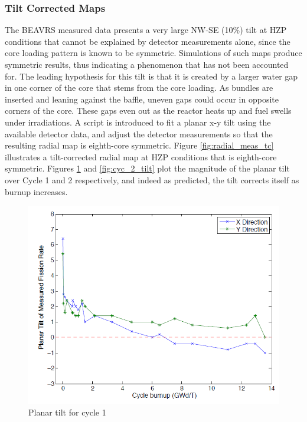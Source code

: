 \subsubsection{Tilt Corrected Maps}
\label{sec:tc_maps}
The BEAVRS measured data presents a very large NW-SE (10\%) tilt at HZP 
conditions that cannot be explained by detector measurements alone, since the 
core loading pattern is known to be symmetric. Simulations of such maps produce 
symmetric results, thus indicating a phenomenon that has not been accounted for. 
The leading hypothesis for this tilt is that it is created by a larger water gap 
in one corner of the core that stems from the core loading. As bundles are inserted 
and leaning against the baffle, uneven gaps could occur in opposite corners of the 
core. These gaps even out as the reactor heats up and fuel swells under irradiations. 
A script is introduced to fit a planar x-y tilt using the available detector data, 
and adjust the detector measurements so that the resulting radial map is eighth-core 
symmetric. Figure \ref{fig:radial_meas_tc} illustrates a tilt-corrected radial map 
at HZP conditions that is eighth-core symmetric. Figures \ref{fig:cyc_1_tilt} and 
\ref{fig:cyc_2_tilt} plot the magnitude of the planar tilt over Cycle 1 and 2 
respectively, and indeed as predicted, the tilt corrects itself as burnup increases.



\begin{figure}[htbp]
  \centering
  \includegraphics[width=5.0in]{expdata/figs/tilt_cycle1.png}
  \caption{Planar tilt for cycle 1
  \label{fig:cyc_1_tilt}}
\end{figure}

